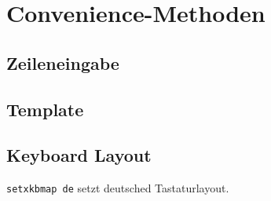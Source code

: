 \section{Convenience-Methoden}

\subsection{Zeileneingabe}


\subsection{Template}


\subsection{Keyboard Layout}
\lstinline{setxkbmap de} setzt deutsched Tastaturlayout.
